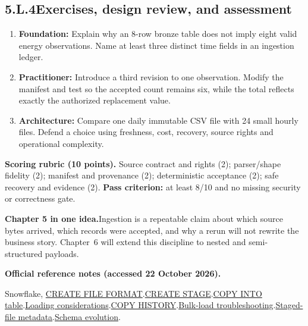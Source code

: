 \documentclass[11pt,twoside]{article}
\newcommand{\topic}[2]{\subsection*{#1\quad #2}}
\begin{document}
\topic{5.L.4}{Exercises, design review, and assessment}
\begin{enumerate}
\item \textbf{Foundation:} Explain why an 8-row bronze table does not imply eight valid energy observations. Name at least three distinct time fields in an ingestion ledger.
\item \textbf{Practitioner:} Introduce a third revision to one observation. Modify the manifest and test so the accepted count remains six, while the total reflects exactly the authorized replacement value.
\item \textbf{Architecture:} Compare one daily immutable CSV file with 24 small hourly files. Defend a choice using freshness, cost, recovery, source rights and operational complexity.
\end{enumerate}
\textbf{Scoring rubric (10 points).} Source contract and rights (2); parser/shape fidelity (2); manifest and provenance (2); deterministic acceptance (2); safe recovery and evidence (2). \textbf{Pass criterion:} at least 8/10 and no missing security or correctness gate.

\begin{whitebox}\textbf{Chapter 5 in one idea.}\quad Ingestion is a repeatable claim about which source bytes arrived, which records were accepted, and why a rerun will not rewrite the business story. Chapter~6 will extend this discipline to nested and semi-structured payloads.\end{whitebox}
{\fontsize{8.05}{9.9}\selectfont\textbf{Official reference notes (accessed 22 October 2026).}\par
[1] Snowflake, \href{https://docs.snowflake.com/en/sql-reference/sql/create-file-format}{CREATE FILE FORMAT}.\quad
[2] \href{https://docs.snowflake.com/en/sql-reference/sql/create-stage}{CREATE STAGE}.\quad
[3] \href{https://docs.snowflake.com/en/sql-reference/sql/copy-into-table}{COPY INTO table}.\quad
[4] \href{https://docs.snowflake.com/en/user-guide/data-load-considerations-load}{Loading considerations}.\quad
[5] \href{https://docs.snowflake.com/en/sql-reference/functions/copy_history}{COPY HISTORY}.\quad
[6] \href{https://docs.snowflake.com/en/user-guide/data-load-bulk-ts}{Bulk-load troubleshooting}.\quad
[7] \href{https://docs.snowflake.com/en/user-guide/querying-metadata}{Staged-file metadata}.\quad
[8] \href{https://docs.snowflake.com/en/user-guide/data-load-schema-evolution}{Schema evolution}.\par}
\end{document}
